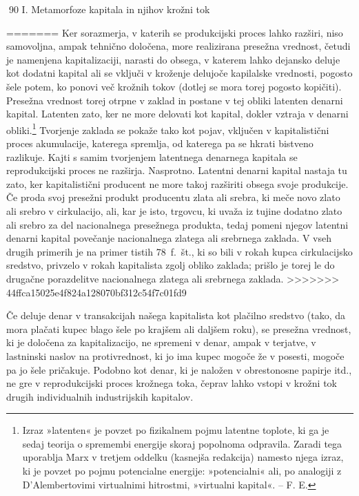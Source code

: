 \documentclass[kapital_02.tex]{subfiles}
\begin{document}
90 I. Metamorfoze kapitala in njihov krožni tok

=======
Ker sorazmerja, v katerih se produkcijski proces lahko razširi, niso samovoljna, ampak tehnično določena, more realizirana presežna vrednost, četudi je namenjena kapitalizaciji, narasti do obsega, v katerem lahko dejansko deluje kot \KPEstran dodatni kapital ali se vključi v kroženje delujoče kapilalske vrednosti, pogosto šele potem, ko ponovi več krožnih tokov (dotlej se mora torej pogosto kopičiti). Presežna vrednost torej otrpne v zaklad in postane v tej obliki latenten denarni kapital. Latenten zato, ker ne more delovati kot kapital, dokler vztraja v denarni obliki.\footnote{Izraz »latenten« je povzet po fizikalnem pojmu latentne toplote, ki ga je sedaj teorija o spremembi energije skoraj popolnoma odpravila. Zaradi tega uporablja Marx v tretjem oddelku (kasnejša redakcija) namesto njega izraz, ki je povzet po pojmu potencialne energije: »potencialni« ali, po analogiji z D'Alembertovimi virtualnimi hitrostmi, »virtualni kapital«. -- F. E.} Tvorjenje zaklada se pokaže tako kot pojav, vključen v kapitalistični proces akumulacije, katerega spremlja, od katerega pa se hkrati bistveno razlikuje. Kajti s samim tvorjenjem latentnega denarnega kapitala se reprodukcijski proces ne razširja. Nasprotno. Latentni denarni kapital nastaja tu zato, ker kapitalistični producent ne more takoj razširiti obsega svoje produkcije. Če proda svoj presežni produkt producentu zlata ali srebra, ki meče novo zlato ali srebro v cirkulacijo, ali, kar je isto, trgovcu, ki uvaža iz tujine dodatno zlato ali srebro za del nacionalnega presežnega produkta, tedaj pomeni njegov latentni denarni kapital povečanje nacionalnega zlatega ali srebrnega zaklada. V vseh drugih primerih je na primer tistih 78~f.~št., ki so bili v rokah kupca cirkulacijsko sredstvo, privzelo v rokah kapitalista zgolj obliko zaklada; prišlo je torej le do drugačne porazdelitve nacionalnega zlatega ali srebrnega zaklada.
>>>>>>> 44ffca15025e4f824a128070bf312c54f7c01fd9

Če deluje denar v transakcijah našega kapitalista kot plačilno sredstvo (tako, da mora plačati kupec blago šele po krajšem ali daljšem roku), se presežna vrednost, ki je določena za kapitalizacijo, ne spremeni v denar, ampak v terjatve, v lastninski naslov na protivrednost, ki jo ima kupec mogoče že v posesti, mogoče pa jo šele pričakuje. Podobno kot denar, ki je naložen v obrestonosne papirje itd., ne gre v reprodukcijski proces krožnega toka, čeprav lahko vstopi v krožni tok drugih individualnih industrijskih kapitalov.
\end{document}
